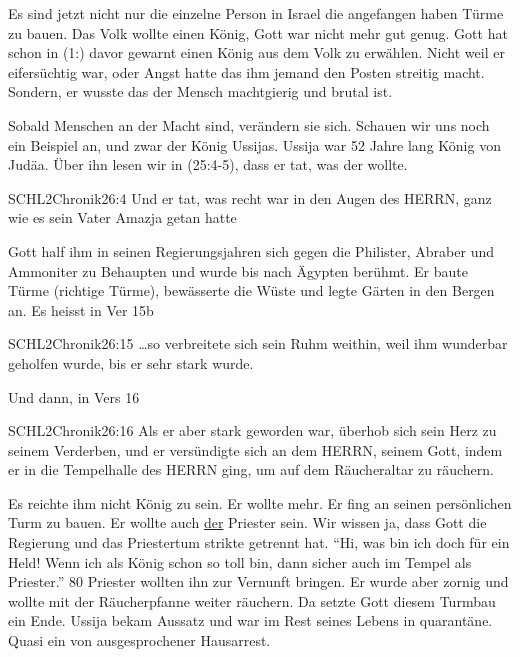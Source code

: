 \documentclass[14pt]{../../inc/mybib}
\newenvironment{block}[1][]{%
  \vspace{1.5em}%
  \noindent\textbf{#1}\par%
  \vspace{0.0em}%
}{%
  \vspace{1em}%
}
\begin{document}
\begin{block}

    Es sind jetzt nicht nur die einzelne Person in Israel die angefangen haben Türme zu bauen. Das Volk wollte einen König, Gott war nicht mehr gut genug. Gott hat schon in (1:) davor gewarnt einen König aus dem Volk zu erwählen. Nicht weil er eifersüchtig war, oder Angst hatte das ihm jemand den Posten streitig macht. Sondern, er wusste das der Mensch machtgierig und brutal ist.
    
    Sobald Menschen an der Macht sind, verändern sie sich. Schauen wir uns noch ein Beispiel an, und zwar der König Ussijas. Ussija war 52 Jahre lang König von Judäa. Über ihn lesen wir in (25:4-5), dass er tat, was der \herr{} wollte. 
    \begin{bibelbox}{SCHL}{2Chronik}{26:4}
        Und er tat, was recht war in den Augen des HERRN, ganz wie es sein Vater Amazja getan hatte
    \end{bibelbox} 
    Gott half ihm in seinen Regierungsjahren sich gegen die Philister, Abraber und Ammoniter zu Behaupten und wurde bis nach Ägypten berühmt. Er baute Türme (richtige Türme), bewässerte die Wüste und legte Gärten in den Bergen an. Es heisst in Ver 15b
    \begin{bibelbox}{SCHL}{2Chronik}{26:15}
        \dots so verbreitete sich sein Ruhm weithin, weil ihm wunderbar geholfen wurde, bis er sehr stark wurde.
    \end{bibelbox} 

    Und dann, in Vers 16
    \begin{bibelbox}{SCHL}{2Chronik}{26:16}
        Als er aber stark geworden war, überhob sich sein Herz zu seinem Verderben, und er versündigte sich an dem HERRN, seinem Gott, indem er in die Tempelhalle des HERRN ging, um auf dem Räucheraltar zu räuchern.
    \end{bibelbox} 
    Es reichte ihm nicht König zu sein. Er wollte mehr. Er fing an seinen persönlichen Turm zu bauen. Er wollte auch \underline{der} Priester sein. Wir wissen ja, dass Gott die Regierung und das Priestertum strikte getrennt hat. 
    \enquote{Hi, was bin ich doch für ein Held! Wenn ich als König schon so toll bin, dann sicher auch im Tempel als Priester.} 80 Priester wollten ihn zur Vernunft bringen. Er wurde aber zornig und wollte mit der Räucherpfanne weiter räuchern. Da setzte Gott diesem Turmbau ein Ende. Ussija bekam Aussatz und war im Rest seines Lebens in quarantäne. Quasi ein von ausgesprochener Hausarrest.
\end{block}
\end{document}
